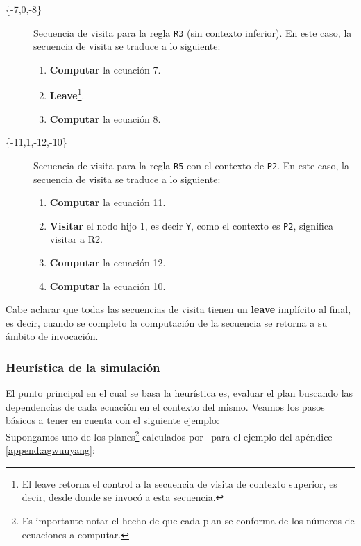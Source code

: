 \begin{description}
\item [\{-7,0,-8\}] Secuencia de visita para la regla \texttt{R3} (sin contexto inferior). En este caso, la secuencia de visita se traduce a lo siguiente:

\begin{enumerate}
\item \textbf{Computar} la ecuación 7.
\item \textbf{Leave}\footnote{El leave retorna el control a la secuencia de visita de contexto superior, es decir, desde donde se invocó a esta secuencia.}.
\item \textbf{Computar} la ecuación 8.
\end{enumerate}

\item [\{-11,1,-12,-10\}] Secuencia de visita para la regla \texttt{R5} con el contexto de \texttt{P2}. En este caso, la secuencia de visita se traduce a lo siguiente:

\begin{enumerate}
\item \textbf{Computar} la ecuación 11.
\item \textbf{Visitar} el nodo hijo 1, es decir \texttt{Y}, como el contexto es \texttt{P2}, significa visitar a R2.
\item \textbf{Computar} la ecuación 12.
\item \textbf{Computar} la ecuación 10.
\end{enumerate}
\end{description}

Cabe aclarar que todas las secuencias de visita tienen un \textbf{leave} implícito al final, es decir, cuando se completo la computación de la secuencia se retorna a su ámbito de invocación.

\subsubsection*{Heurística de la simulación}
\label{subsec:heuris-simul}
El punto principal en el cual se basa la heurística es, evaluar el plan buscando las dependencias de cada ecuación en el contexto del mismo. Veamos los pasos básicos a tener en cuenta con el siguiente ejemplo:\\

Supongamos uno de los planes\footnote{Es importante notar el hecho de que cada plan se conforma de los números de ecuaciones a computar.} calculados por \maggen\ para el ejemplo del apéndice \ref{append:agwuuyang}:\\

